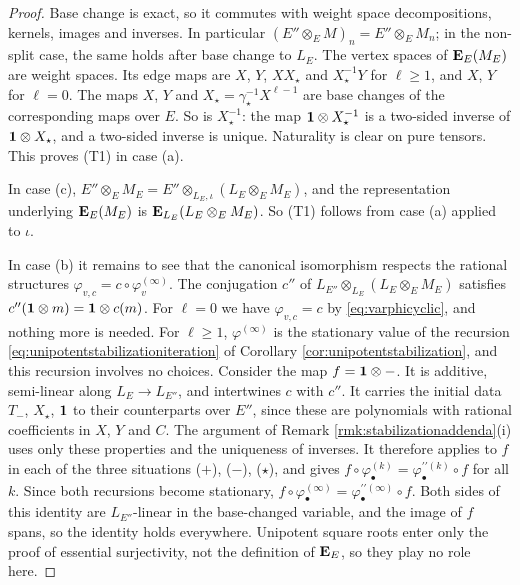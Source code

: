 \documentclass[a4paper,12pt,reqno]{amsart}
\newcommand{\EE}{{\rm\bf E}}
\theoremstyle{plain}
\theoremstyle{remark}
\begin{document}
    \begin{proof}
    Base change is exact, so it commutes with weight space decompositions, kernels, images and inverses. In particular $(E''\otimes_EM)_n=E''\otimes_EM_n$; in the non-split case, the same holds after base change to $L_E$. The vertex spaces of $\EE_E(M_E)$ are weight spaces. Its edge maps are $X$, $Y$, $XX_\star$ and $X_\star^{-1}Y$ for $\ell\geq1$, and $X$, $Y$ for $\ell=0$. The maps $X$, $Y$ and $X_\star=\gamma_\star^{-1}X^{\ell-1}$ are base changes of the corresponding maps over $E$. So is $X_\star^{-1}$: the map ${\bf1}\otimes X_\star^{-1}$ is a two-sided inverse of ${\bf1}\otimes X_\star$, and a two-sided inverse is unique. Naturality is clear on pure tensors. This proves (T1) in case (a).

    In case (c), $E''\otimes_EM_E=E''\otimes_{L_E,\iota}(L_E\otimes_EM_E)$, and the representation underlying $\EE_E(M_E)$ is $\EE_{L_E}(L_E\otimes_EM_E)$. So (T1) follows from case (a) applied to $\iota$.

    In case (b) it remains to see that the canonical isomorphism respects the rational structures $\varphi_{v,c}=c\circ\varphi_v^{(\infty)}$. The conjugation $c''$ of $L_{E''}\otimes_{L_E}(L_E\otimes_EM_E)$ satisfies $c''({\bf1}\otimes m)={\bf1}\otimes c(m)$. For $\ell=0$ we have $\varphi_{v,c}=c$ by \eqref{eq:varphicyclic}, and nothing more is needed. For $\ell\geq1$, $\varphi^{(\infty)}$ is the stationary value of the recursion \eqref{eq:unipotentstabilizationiteration} of Corollary \ref{cor:unipotentstabilization}, and this recursion involves no choices. Consider the map $f={\bf1}\otimes-$. It is additive, semi-linear along $L_E\to L_{E''}$, and intertwines $c$ with $c''$. It carries the initial data $T_-$, $X_\star$, ${\bf1}$ to their counterparts over $E''$, since these are polynomials with rational coefficients in $X$, $Y$ and $C$. The argument of Remark \ref{rmk:stabilizationaddenda}(i) uses only these properties and the uniqueness of inverses. It therefore applies to $f$ in each of the three situations ($+$), ($-$), ($\star$), and gives $f\circ\varphi^{(k)}_\bullet=\varphi^{\prime\prime(k)}_\bullet\circ f$ for all $k$. Since both recursions become stationary, $f\circ\varphi^{(\infty)}_\bullet=\varphi^{\prime\prime(\infty)}_\bullet\circ f$. Both sides of this identity are $L_{E''}$-linear in the base-changed variable, and the image of $f$ spans, so the identity holds everywhere. Unipotent square roots enter only the proof of essential surjectivity, not the definition of $\EE_E$, so they play no role here.


\end{proof}
\end{document}
